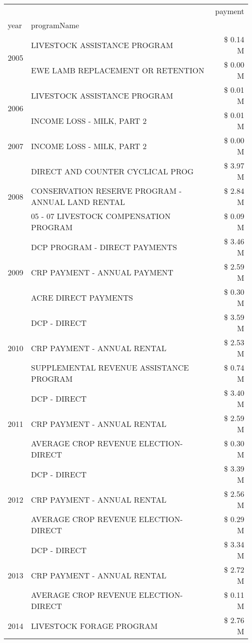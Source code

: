 \begin{tabular}{llr}
\toprule
 &  & payment \\
year & programName &  \\
\midrule
\multirow[t]{2}{*}{2005} & LIVESTOCK ASSISTANCE PROGRAM & \$ 0.14 M \\
 & EWE LAMB REPLACEMENT OR RETENTION & \$ 0.00 M \\
\cline{1-3}
\multirow[t]{2}{*}{2006} & LIVESTOCK ASSISTANCE PROGRAM & \$ 0.01 M \\
 & INCOME LOSS - MILK, PART 2 & \$ 0.01 M \\
\cline{1-3}
2007 & INCOME LOSS - MILK, PART 2 & \$ 0.00 M \\
\cline{1-3}
\multirow[t]{3}{*}{2008} & DIRECT AND COUNTER CYCLICAL PROG & \$ 3.97 M \\
 & CONSERVATION RESERVE PROGRAM - ANNUAL LAND RENTAL & \$ 2.84 M \\
 & 05 - 07 LIVESTOCK COMPENSATION PROGRAM & \$ 0.09 M \\
\cline{1-3}
\multirow[t]{3}{*}{2009} & DCP PROGRAM - DIRECT PAYMENTS & \$ 3.46 M \\
 & CRP PAYMENT - ANNUAL PAYMENT & \$ 2.59 M \\
 & ACRE DIRECT PAYMENTS & \$ 0.30 M \\
\cline{1-3}
\multirow[t]{3}{*}{2010} & DCP - DIRECT & \$ 3.59 M \\
 & CRP PAYMENT - ANNUAL RENTAL & \$ 2.53 M \\
 & SUPPLEMENTAL REVENUE ASSISTANCE PROGRAM & \$ 0.74 M \\
\cline{1-3}
\multirow[t]{3}{*}{2011} & DCP - DIRECT & \$ 3.40 M \\
 & CRP PAYMENT - ANNUAL RENTAL & \$ 2.59 M \\
 & AVERAGE CROP REVENUE ELECTION-DIRECT & \$ 0.30 M \\
\cline{1-3}
\multirow[t]{3}{*}{2012} & DCP - DIRECT & \$ 3.39 M \\
 & CRP PAYMENT - ANNUAL RENTAL & \$ 2.56 M \\
 & AVERAGE CROP REVENUE ELECTION-DIRECT & \$ 0.29 M \\
\cline{1-3}
\multirow[t]{3}{*}{2013} & DCP - DIRECT & \$ 3.34 M \\
 & CRP PAYMENT - ANNUAL RENTAL & \$ 2.72 M \\
 & AVERAGE CROP REVENUE ELECTION-DIRECT & \$ 0.11 M \\
\cline{1-3}
\multirow[t]{3}{*}{2014} & LIVESTOCK FORAGE PROGRAM & \$ 2.76 M \\

\end{tabular}
